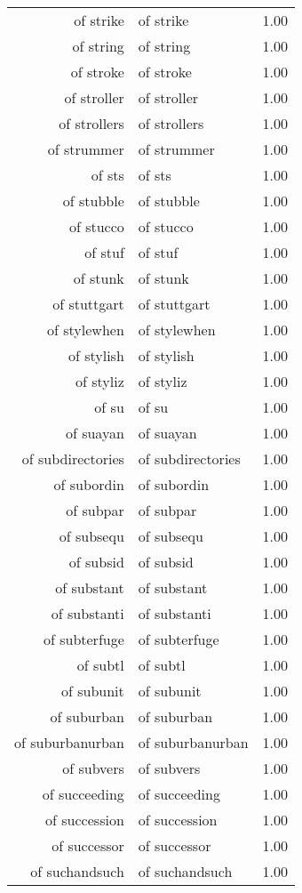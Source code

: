 \begin{table}[ht]
\begin{tabular}{rlr}
  of strike & of strike & 1.00 \\ 
  of string & of string & 1.00 \\ 
  of stroke & of stroke & 1.00 \\ 
  of stroller & of stroller & 1.00 \\ 
  of strollers & of strollers & 1.00 \\ 
  of strummer & of strummer & 1.00 \\ 
  of sts & of sts & 1.00 \\ 
  of stubble & of stubble & 1.00 \\ 
  of stucco & of stucco & 1.00 \\ 
  of stuf & of stuf & 1.00 \\ 
  of stunk & of stunk & 1.00 \\ 
  of stuttgart & of stuttgart & 1.00 \\ 
  of stylewhen & of stylewhen & 1.00 \\ 
  of stylish & of stylish & 1.00 \\ 
  of styliz & of styliz & 1.00 \\ 
  of su & of su & 1.00 \\ 
  of suayan & of suayan & 1.00 \\ 
  of subdirectories & of subdirectories & 1.00 \\ 
  of subordin & of subordin & 1.00 \\ 
  of subpar & of subpar & 1.00 \\ 
  of subsequ & of subsequ & 1.00 \\ 
  of subsid & of subsid & 1.00 \\ 
  of substant & of substant & 1.00 \\ 
  of substanti & of substanti & 1.00 \\ 
  of subterfuge & of subterfuge & 1.00 \\ 
  of subtl & of subtl & 1.00 \\ 
  of subunit & of subunit & 1.00 \\ 
  of suburban & of suburban & 1.00 \\ 
  of suburbanurban & of suburbanurban & 1.00 \\ 
  of subvers & of subvers & 1.00 \\ 
  of succeeding & of succeeding & 1.00 \\ 
  of succession & of succession & 1.00 \\ 
  of successor & of successor & 1.00 \\ 
  of suchandsuch & of suchandsuch & 1.00 \\ 

\end{tabular}
\end{table}

